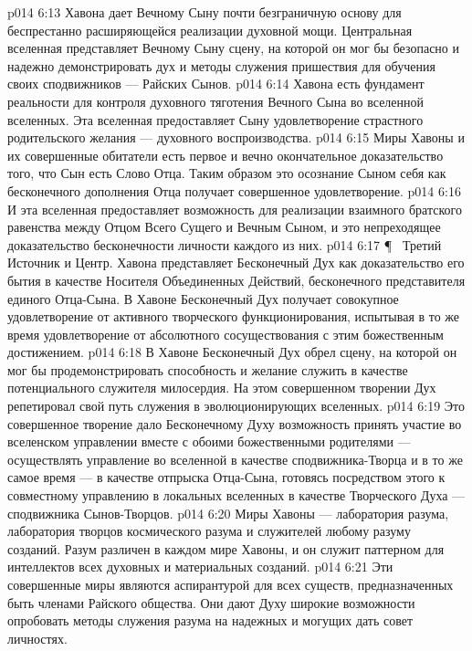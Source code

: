 \vs p014 6:13 Хавона дает Вечному Сыну почти безграничную основу для беспрестанно расширяющейся реализации духовной мощи. Центральная вселенная представляет Вечному Сыну сцену, на которой он мог бы безопасно и надежно демонстрировать дух и методы служения пришествия для обучения своих сподвижников --- Райских Сынов.
\vs p014 6:14 Хавона есть фундамент реальности для контроля духовного тяготения Вечного Сына во вселенной вселенных. Эта вселенная предоставляет Сыну удовлетворение страстного родительского желания --- духовного воспроизводства.
\vs p014 6:15 Миры Хавоны и их совершенные обитатели есть первое и вечно окончательное доказательство того, что Сын есть Слово Отца. Таким образом это осознание Сыном себя как бесконечного дополнения Отца получает совершенное удовлетворение.
\vs p014 6:16 И эта вселенная предоставляет возможность для реализации взаимного братского равенства между Отцом Всего Сущего и Вечным Сыном, и это непреходящее доказательство бесконечности личности каждого из них.
\vs p014 6:17 \P\ \bibnobreakspace {} Третий Источник и Центр. Хавона представляет Бесконечный Дух как доказательство его бытия в качестве Носителя Объединенных Действий, бесконечного представителя единого Отца\hyp{}Сына. В Хавоне Бесконечный Дух получает совокупное удовлетворение от активного творческого функционирования, испытывая в то же время удовлетворение от абсолютного сосуществования с этим божественным достижением.
\vs p014 6:18 В Хавоне Бесконечный Дух обрел сцену, на которой он мог бы продемонстрировать способность и желание служить в качестве потенциального служителя милосердия. На этом совершенном творении Дух репетировал свой путь служения в эволюционирующих вселенных.
\vs p014 6:19 Это совершенное творение дало Бесконечному Духу возможность принять участие во вселенском управлении вместе с обоими божественными родителями --- осуществлять управление во вселенной в качестве сподвижника\hyp{}Творца и в то же самое время --- в качестве отпрыска Отца\hyp{}Сына, готовясь посредством этого к совместному управлению в локальных вселенных в качестве Творческого Духа --- сподвижника Сынов\hyp{}Творцов.
\vs p014 6:20 Миры Хавоны --- лаборатория разума, лаборатория творцов космического разума и служителей любому разуму созданий. Разум различен в каждом мире Хавоны, и он служит паттерном для интеллектов всех духовных и материальных созданий.
\vs p014 6:21 Эти совершенные миры являются аспирантурой для всех существ, предназначенных быть членами Райского общества. Они дают Духу широкие возможности опробовать методы служения разума на надежных и могущих дать совет личностях.
